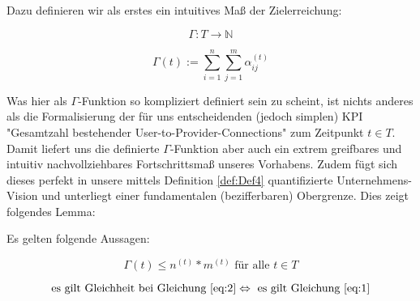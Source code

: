 \documentclass[11pt]{scrartcl}
\begin{document}
Dazu definieren wir als erstes ein intuitives Maß der Zielerreichung:

\vspace{0.3cm}

\begin{Def}\label{def:Def5}
\begin{equation*}
  \Gamma : T \rightarrow \mathbb{N} 
\end{equation*}

\begin{equation*}
  \Gamma(t):= \sum_{i=1}^n \sum_{j=1}^m \alpha^{(t)}_{ij} 
\end{equation*}

\end{Def}

\vspace{1cm}

Was hier als $\Gamma$-Funktion so kompliziert definiert sein zu scheint, ist nichts anderes als die Formalisierung der für uns entscheidenden (jedoch simplen) KPI "Gesamtzahl bestehender User-to-Provider-Connections" zum Zeitpunkt $t \in T$. Damit liefert uns die definierte $\Gamma$-Funktion aber auch ein extrem greifbares und intuitiv nachvollziehbares Fortschrittsmaß unseres Vorhabens. Zudem fügt sich dieses perfekt in unsere mittels Definition \ref{def:Def4} quantifizierte Unternehmens-Vision und unterliegt einer fundamentalen (bezifferbaren) Obergrenze. Dies zeigt folgendes Lemma:

\vspace{0.3cm}

\begin{Lemma}

Es gelten folgende Aussagen:

\begin{equation}
\label{eq:2}
  \Gamma(t) \leq n^{(t)} * m^{(t)} \textrm{ für alle } t \in T
\end{equation}

\begin{equation}
\label{eq:3}
  \textrm{es gilt Gleichheit bei Gleichung }  \eqref{eq:2} \Leftrightarrow \textrm{ es gilt Gleichung } \eqref{eq:1}
\end{equation}

\end{Lemma}

\vspace{0.3cm}
\end{document}
